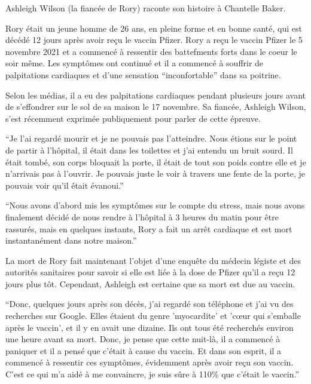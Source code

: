 Ashleigh Wilson (la fiancée de Rory) raconte son histoire à Chantelle Baker.

Rory était un jeune homme de 26 ans, en pleine forme et en bonne santé, qui est
décédé 12 jours après avoir reçu le vaccin Pfizer. Rory a reçu le vaccin Pfizer
le 5 novembre 2021 et a commencé à ressentir des battefments forts dans le coeur
le soir même. Les symptômes ont continué et il a commencé à souffrir de
palpitations cardiaques et d'une sensation “inconfortable” dans sa poitrine.

Selon les médias, il a eu des palpitations cardiaques pendant plusieurs jours
avant de s'effondrer sur le sol de sa maison le 17 novembre. Sa fiancée,
Ashleigh Wilson, s'est récemment exprimée publiquement pour parler de cette
épreuve.

“Je l'ai regardé mourir et je ne pouvais pas l'atteindre. Nous étions sur le
point de partir à l'hôpital, il était dans les toilettes et j'ai entendu un
bruit sourd. Il était tombé, son corps bloquait la porte, il était de tout son
poids contre elle et je n'arrivais pas à l'ouvrir. Je pouvais juste le voir à
travers une fente de la porte, je pouvais voir qu'il était évanoui.”

“Nous avons d'abord mis les symptômes sur le compte du stress, mais nous avons
finalement décidé de nous rendre à l'hôpital à 3 heures du matin pour être
rassurés, mais en quelques instants, Rory a fait un arrêt cardiaque et est mort
instantanément dans notre maison.”

La mort de Rory fait maintenant l'objet d'une enquête du médecin légiste et des
autorités sanitaires pour savoir si elle est liée à la dose de Pfizer qu'il a
reçu 12 jours plus tôt. Cependant, Ashleigh est certaine que sa mort est due au
vaccin.

“Donc, quelques jours après son décès, j'ai regardé son téléphone et j'ai vu des
recherches sur Google. Elles étaient du genre 'myocardite' et 'cœur qui
s'emballe après le vaccin', et il y en avait une dizaine. Ils ont tous été
recherchés environ une heure avant sa mort. Donc, je pense que cette nuit-là, il
a commencé à paniquer et il a pensé que c'était à cause du vaccin. Et dans son
esprit, il a commencé à ressentir ces symptômes, évidemment après avoir reçu son
vaccin. C'est ce qui m'a aidé à me convaincre, je suis sûre à 110\% que c'était
le vaccin.”

